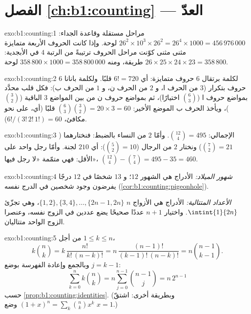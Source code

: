 \section*{الفصل \ref{ch:b1:counting} --- العدّ}

\begin{solution}{exo:b1:counting:1}
مراحل مستقلة وقاعدة الجداء: $26^2 \times 10^3 \times 26^2
= 26^4 \times 1000 = 456\,976\,000$ لوحة. وإذا كانت الحروف الأربعة
متمايزة مثنى مثنى كوّنت مراحل الحروف ترتيبةً من الرتبة $4$ في
الأبجدية: $26 \times 25 \times 24 \times 23 = 358\,800$ طريقة، ومنه
$358\,800 \times 1000 = 358\,800\,000$ لوحة.
\end{solution}

\begin{solution}{exo:b1:counting:2}
لكلمة \textsc{برتقال} $6$ حروف متمايزة: أي $6! = 720$ قلبًا.
ولكلمة \textsc{بانانا} $6$ حروف بتكرار ($3$ من الحرف ا، و $2$ من
الحرف ن، و $1$ من الحرف ب): فكل قلب محدَّد بمواضع حروف ا
($\binom 63$ اختيارًا)، ثم بمواضع حروف ن من بين المواضع $3$ الباقية
($\binom 32$)، ويأخذ الحرف ب الموضع الأخير:
$\binom{6}{3}\binom{3}{2} = 20 \times 3 = 60$ قلبًا
(أي، على نحو مكافئ، $6!/(3!\,2!\,1!) = 60$).
\end{solution}

\begin{solution}{exo:b1:counting:3}
الإجمالي: $\binom{12}{4} = 495$. وأمّا $2$ من النساء بالضبط: فنختارهما
($\binom 72 = 21$) ونختار $2$ من الرجال ($\binom 52 = 10$): أي $210$ لجنة.
وأمّا رجل واحد على الأقل: فهي متمّمة «لا رجل فيها»،
$\binom{12}{4} - \binom{7}{4} = 495 - 35 = 460$.
\end{solution}

\begin{solution}{exo:b1:counting:4}
\emph{شهور الميلاد:} الأدراج هي الشهور $12$؛ و $13$ شخصًا في $12$
درجًا يفرضون وجود شخصين في الدرج نفسه
(\cref{cor:b1:counting:pigeonhole}).

\emph{الأعداد المتتالية:} الأدراج هي الأزواج $n$ $\{1,2\},
\{3,4\}, \dots, \{2n-1, 2n\}$، وهي تجزّئ $\intint{1}{2n}$.
واختيار $n + 1$ عددًا صحيحًا يضع عددين في الزوج نفسه، وعنصرا
الزوج الواحد متتاليان.
\end{solution}

\begin{solution}{exo:b1:counting:5}
من أجل $1 \leq k \leq n$،
\[
k \binom nk = k\,\frac{n!}{k!\,(n-k)!}
= n\,\frac{(n-1)!}{(k-1)!\,(n-k)!} = n \binom{n-1}{k-1}.
\]
وبالجمع وإعادة الفهرسة بوضع $j = k - 1$:
\[
\sum_{k=0}^{n} k \binom nk = n \sum_{j=0}^{n-1} \binom{n-1}{j}
= n\, 2^{n-1}
\]
حسب \cref{prop:b1:counting:identities}. (وبطريقة أخرى: اشتقّ
$(1+x)^n = \sum_k \binom nk x^k$ وضع $x = 1$.)
\end{solution}

